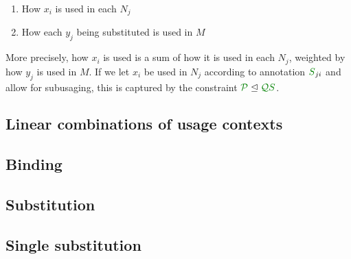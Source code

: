 \documentclass[acmsmall,review]{acmart}
\begin{document}
\begin{enumerate}
\item How $x_i$ is used in each $N_j$
\item How each $y_j$ being substituted is used in $M$
\end{enumerate}

More precisely, how $x_i$ is used is a sum of how it is used in each $N_j$,
weighted by how $y_j$ is used in $M$.
If we let $x_i$ be used in $N_j$ according to annotation $\resmat S_{ji}$ and
allow for subusaging, this is captured by the constraint
$\resctx P \subres \resctx Q \resmat S$.

%

\subsection{Linear combinations of usage contexts}

%

\subsection{Binding}

\subsection{Substitution}

\subsection{Single substitution}
\end{document}
